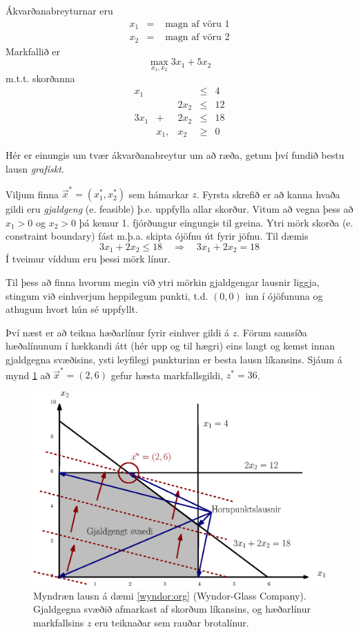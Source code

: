 \begin{lausn}Ákvarðanabreyturnar eru
\begin{eqnarray*}
 x_1 &=& \textrm{ magn af vöru } 1\\
x_2 &=& \textrm{ magn af vöru } 2
\end{eqnarray*}
Markfallið er 
\begin{equation}
\max_{x_1,x_2} 3x_1+5x_2 \label{wyndor:markfall} 
\end{equation}
m.t.t. skorðanna
\[\begin{array}{ccccc}
 x_1 & && \leq & 4 \\
 & &2x_2 & \leq &12 \\
 3x_1& + &2x_2&\leq&18\\
 &x_1,&x_2&\geq&0
\end{array}\]

Hér er einungis um tvær ákvarðanabreytur um að ræða, getum því fundið bestu lausn \emph{grafískt}. 
 
Viljum finna $\vec{x}^*=(x_1^*,x_2^*)$ sem hámarkar $z$. Fyrsta skrefið er að kanna hvaða gildi eru \emph{gjaldgeng} (e. feasible) þ.e. uppfylla allar skorður. Vitum að vegna þess að $x_1>0$ og $x_2>0$ þá kemur 1. fjórðungur eingungis til greina. Ytri mörk skorða (e. constraint boundary) fást m.þ.a. skipta ójöfnu út fyrir jöfnu. Til dæmis
$$ 3x_1+2x_2\leq 18 \quad \Rightarrow \quad 3x_1+2x_2=18$$
Í tveimur víddum eru þessi mörk línur.

\begin{aths}Til þess að finna hvorum megin við ytri mörkin gjaldgengar lausnir liggja, stingum við einhverjum heppilegum punkti, t.d. $(0,0)$ inn í ójöfununa og athugum hvort hún sé uppfyllt. 
\end{aths}
Því næst er að teikna hæðarlínur fyrir einhver gildi á $z$. Förum samsíða hæðalínunum í hækkandi átt (hér upp og til hægri) eins langt og kemst innan gjaldgegna svæðisins, ysti leyfilegi punkturinn er besta lausn líkansins. Sjáum á mynd \ref{wyndor:img:grafisk} að $\vec{x}^*=(2,6)$ gefur hæsta markfallsgildi, $z^*=36$.

\begin{figure}[t!]
\centering
\includegraphics[width=0.7\columnwidth]{figs/wyndor_org.eps}
\caption{Myndræn lausn á dæmi \ref{wyndor:org} (Wyndor-Glass Company). Gjaldgegna svæðið afmarkast af skorðum líkansins, og hæðarlínur markfallsins $z$ eru teiknaðar sem rauðar brotalínur.}\label{wyndor:img:grafisk}
\end{figure}
\end{lausn}

